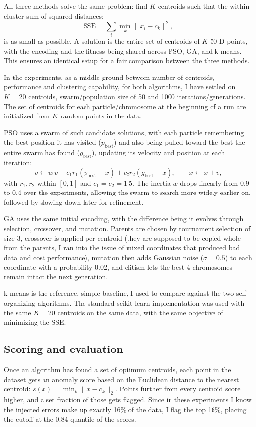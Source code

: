 \documentclass[11pt,a4paper]{article}
\begin{document}
All three methods solve the same problem: find $K$ centroids such that the within-cluster sum of squared distances:
\[
\mathrm{SSE} = \sum_{i} \min_{k} \lVert x_i - c_k \rVert^2,
\]
is as small as possible. A solution is the entire set of centroids of $K$ 50-D points, with the encoding and the fitness being shared across PSO, GA, and k-means. This ensures an identical setup for a fair comparison between the three methods.

In the experiments, as a middle ground between number of centroids, performance and clustering capability, for both algorithms, I have settled on $K=20$ centroids, swarm/population size of 50 and 1000 iterations/generations. The set of centroids for each particle/chromosome at the beginning of a run are initialized from $K$ random points in the data.

PSO uses a swarm of such candidate solutions, with each particle remembering the best position it has visited ($p_\text{best}$) and also being pulled toward the best the entire swarm has found ($g_\text{best}$), updating its velocity and position at each iteration:
\[v \leftarrow w\,v + c_1 r_1 (p_\text{best} - x) + c_2 r_2 (g_\text{best} - x), \qquad x \leftarrow x + v,\]
with $r_1, r_2$ within $[0,1]$ and $c_1 = c_2 = 1.5$. The inertia $w$ drops linearly from 0.9 to 0.4 over the experiments, allowing the swarm to search more widely earlier on, followed by slowing down later for refinement. 

GA uses the same initial encoding, with the difference being it evolves through selection, crossover, and mutation. Parents are chosen by tournament selection of size 3, crossover is applied per centroid (they are supposed to be copied whole from the parents, I ran into the issue of mixed coordinates that produced bad data and cost performance), mutation then adds Gaussian noise ($\sigma = 0.5$) to each coordinate with a probability 0.02, and elitism lets the best 4 chromosomes remain intact the next generation. 

k-means is the reference, simple baseline, I used to compare against the two self-organizing algorithms. The standard scikit-learn implementation was used with the same $K=20$ centroids on the same data, with the same objective of minimizing the SSE.

\subsection{Scoring and evaluation}

Once an algorithm has found a set of optimum centroids, each point in the dataset gets an anomaly score based on the Euclidean distance to the nearest centroid:
$s(x) = \min_k \lVert x - c_k \rVert_2$. 
Points further from every centroid score higher, and a set fraction of those gets flagged. Since in these experiments I know the injected errors make up exactly 16\% of the data, I flag the top 16\%, placing the cutoff at the 0.84 quantile of the scores.
\end{document}
